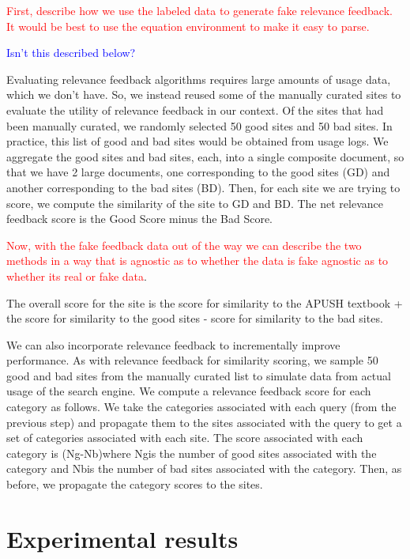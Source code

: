 \documentclass[pdfpagelabels=false,plainpages=true]{acm_proc_article-sp}
\begin{document}
\textcolor{red}{First, describe how we use the labeled data to generate fake
  relevance feedback. It would be best to use the equation environment to make
  it easy to parse. }

\textcolor{blue}{Isn't this described below?}

Evaluating relevance feedback algorithms requires large amounts of usage
data, which we don't have. So, we instead reused some of the manually curated
sites to evaluate the utility of relevance feedback in our context. Of the sites
that had been manually curated, we randomly selected 50 good sites and 50 bad
sites. In practice, this list of good and bad sites would be obtained from usage
logs. We aggregate the good sites and bad sites, each, into a single composite
document, so that we have 2 large documents, one corresponding to the good sites
(GD) and another corresponding to the bad sites (BD). Then, for each site we are
trying to score, we compute the similarity of the site to GD and BD. The net
relevance feedback score is the Good Score minus the Bad Score. 

\textcolor{red}{Now, with the fake feedback data out of the way we can describe
  the two methods in a way that is agnostic as to whether the data is fake
  agnostic as to whether its real or fake data}. 

The overall score for the site is the score for similarity to the APUSH textbook + the score
for similarity to the good sites - score for similarity to the bad sites. 

We can also incorporate relevance feedback to incrementally improve
performance. As with relevance feedback for similarity scoring, we sample 50
good and bad sites from the manually curated list to simulate data from actual
usage of the search engine. We compute a relevance feedback score for each
category as follows. We take the categories associated with each query (from the
previous step) and propagate them to the sites associated with the query to get
a set of categories associated with each site. The score associated with each
category is (Ng-Nb)where Ngis the number of good sites associated with the
category and Nbis the number of bad sites associated with the category. Then, as
before, we propagate the category scores to the sites.  

\section{Experimental results}
\end{document}

